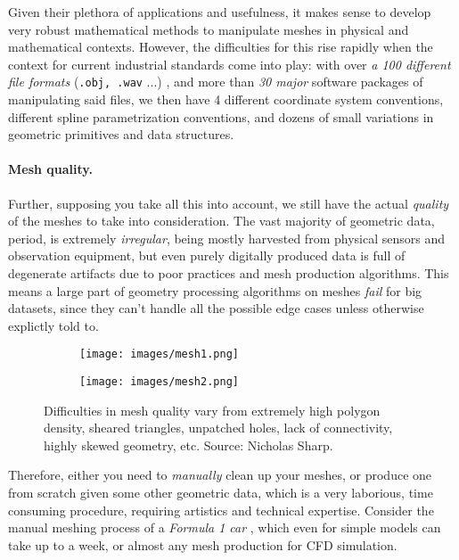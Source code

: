 Given their plethora of applications and usefulness, it makes sense to develop
very robust mathematical methods to manipulate meshes in physical
and mathematical contexts. However, the difficulties for this rise rapidly
when the context for current industrial standards come into play:
with over \textit{a 100 different file formats} (\texttt{.obj, .wav} ...) \cite{wiki_Files},
and more than \textit{30 major} software packages of manipulating 
said files, we then have 4 different coordinate system conventions,
different spline parametrization conventions, and dozens of small
variations in geometric primitives and data structures.

\spa

\paragraph{Mesh quality.} Further, supposing you take all this into account, we still have
the actual \textit{quality} of the meshes to take into consideration.
The vast majority of geometric data, period, is extremely \textit{irregular},
being mostly harvested from physical sensors and observation equipment, but
even purely digitally produced data is full of degenerate artifacts due
to poor practices and mesh production algorithms.
This means a large part of geometry processing algorithms on meshes
\textit{fail} for big datasets, since they can't handle all
the possible edge cases unless otherwise explictly told to.


\begin{figure}[h]
    \centering
    \begin{subfigure}[t]{0.4\textwidth}
        \centering
        \texttt{[image: images/mesh1.png]}
    \end{subfigure}
    \begin{subfigure}[t]{0.46\textwidth}
        \centering
        \texttt{[image: images/mesh2.png]}
    \end{subfigure}
    
    \caption{Difficulties in mesh quality vary from extremely high
    polygon density, sheared triangles, unpatched holes, lack of
    connectivity, highly skewed geometry, etc.
    Source: Nicholas Sharp.}
    \label{fig:two-images}
\end{figure}

Therefore, either you need to \textit{manually} clean up your meshes,
or produce one from scratch given some other geometric data, which is
a very laborious, time consuming procedure, requiring artistics and technical
expertise. Consider the manual meshing process of a \textit{Formula 1 car}
\cite{beta-cae-cfd-formula-car}, which even for simple models
can take up to a week, or almost any mesh production for CFD simulation.


